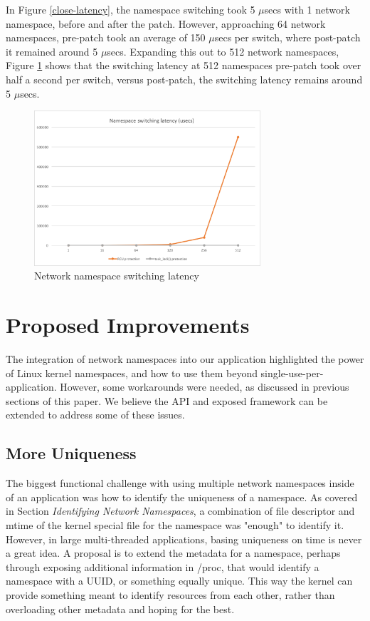 \documentclass[letterpaper]{article}
\begin{document}
In Figure \ref{close-latency}, the namespace switching took 5 $\mu$secs with 1 network namespace, before and after the patch. However, approaching 64 network namespaces, pre-patch took an average of 150 $\mu$secs per switch, where post-patch it remained around 5 $\mu$secs. Expanding this out to 512 network namespaces, Figure \ref{full-latency} shows that the switching latency at 512 namespaces pre-patch took over half a second per switch, versus post-patch, the switching latency remains around 5 $\mu$secs.

\begin{figure}[h]
\includegraphics[width=3.31in]{full-namespace-latency.png}
\caption{Network namespace switching latency}
\label{full-latency}
\end{figure}

\section{Proposed Improvements}
The integration of network namespaces into our application highlighted the power of Linux kernel namespaces, and how to use them beyond single-use-per-application. However, some workarounds were needed, as discussed in previous sections of this paper. We believe the API and exposed framework can be extended to address some of these issues.

\subsection{More Uniqueness}
The biggest functional challenge with using multiple network namespaces inside of an application was how to identify the uniqueness of a namespace. As covered in Section \textit{Identifying Network Namespaces}, a combination of file descriptor and mtime of the kernel special file for the namespace was "enough" to identify it. However, in large multi-threaded applications, basing uniqueness on time is never a great idea. A proposal is to extend the metadata for a namespace, perhaps through exposing additional information in /proc, that would identify a namespace with a UUID, or something equally unique. This way the kernel can provide something meant to identify resources from each other, rather than overloading other metadata and hoping for the best.
\end{document}
